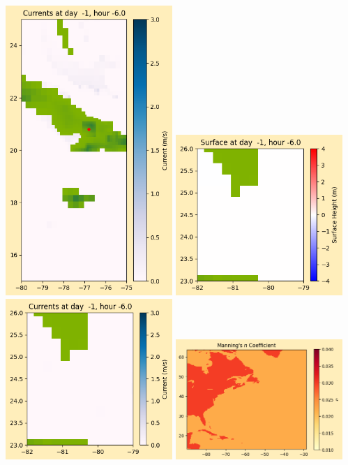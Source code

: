 \documentclass[11pt]{article}
\begin{document}
\includegraphics[width=0.475\textwidth]{frame0007fig1008.png}
\vskip 10pt 
\includegraphics[width=0.475\textwidth]{frame0007fig1009.png}
\includegraphics[width=0.475\textwidth]{frame0007fig1010.png}
\vskip 10pt 
\includegraphics[width=0.475\textwidth]{frame0007fig1011.png}
\end{document}
